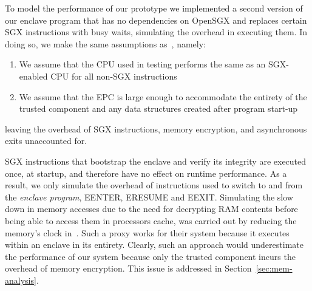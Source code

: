 \documentclass[../../../main.tex]{subfiles}
\begin{document}
\label{sec:perfmodel}
To model the performance of our prototype we implemented a second
version of our enclave program that has no dependencies on OpenSGX and
replaces certain SGX instructions with busy waits, simulating the
overhead in executing them. In doing so, we make the same assumptions
as~\cite{Baumann14}, namely:
\begin{enumerate}
  \item We assume that the CPU used in testing performs the same as an
    SGX-enabled CPU for all non-SGX instructions
  \item We assume that the EPC is large enough to accommodate the
    entirety of the trusted component and any data structures created
    after program start-up
\end{enumerate}
leaving the overhead of SGX instructions, memory encryption, and
asynchronous exits unaccounted for.

SGX instructions that bootstrap the enclave and verify its integrity
are executed once, at startup, and therefore have no effect on runtime
performance. As a result, we only simulate the overhead of
instructions used to switch to and from the \textit{enclave program},
EENTER, ERESUME and EEXIT. Simulating the slow down in memory accesses
due to the need for decrypting RAM contents before being able to
access them in processors cache, was carried out by reducing the
memory's clock in~\cite{Baumann14}. Such a proxy works for their
system because it executes within an enclave in its entirety. Clearly,
such an approach would underestimate the performance of our system
because only the trusted component incurs the overhead of memory
encryption. This issue is addressed in Section~\ref{sec:mem-analysis}.
\end{document}
